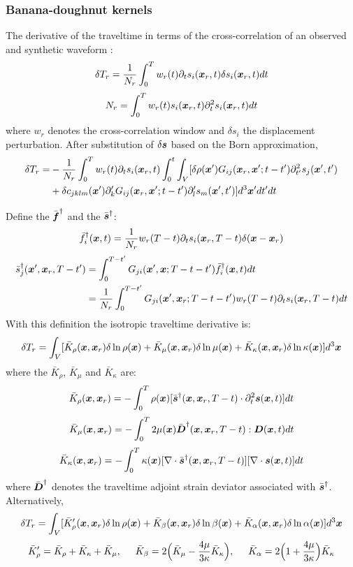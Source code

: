 \subsubsection{Banana-doughnut kernels}
The \Frechet derivative of the traveltime in terms of the cross-correlation
of an observed and synthetic waveform
:
\[ \delta T_r=\frac{1}{N_r}\int_0^Tw_r(t)\partial_ts_i(\boldsymbol{x}_r,t)\delta s_i(\boldsymbol{x}_r,t)dt \]
\[ N_r=\int_0^Tw_r(t)s_i(\boldsymbol{x}_r,t)\partial_t^2s_i(\boldsymbol{x}_r,t)dt \]
where $w_r$ denotes the cross-correlation window and $\delta s_i$ the displacement perturbation.
After substitution of $\delta\boldsymbol{s}$ based on the Born approximation,
\begin{align*}
  \delta T_r= & -\frac{1}{N_r}\int_0^Tw_r(t)\partial_ts_i(\boldsymbol{x}_r,t)\int_0^t\int_V[\delta\rho(\boldsymbol{x}')G_{ij}(\boldsymbol{x}_r,\boldsymbol{x}';t-t')\partial_{t'}^2s_j(\boldsymbol{x}',t') \\
    & +\delta c_{jklm}(\boldsymbol{x}')\partial_k' G_{ij}(\boldsymbol{x}_r,\boldsymbol{x}';t-t')\partial_l' s_m(\boldsymbol{x}',t')]d^3\boldsymbol{x}'dt'dt
\end{align*}

Define the  $\bar{\boldsymbol{f}}^\dagger$
and the  $\bar{\boldsymbol{s}}^\dagger$:
\[ \bar f_i^\dagger(\boldsymbol{x},t)=\frac{1}{N_r}w_r(T-t)\partial_ts_i(\boldsymbol{x}_r,T-t)\delta(\boldsymbol{x}-\boldsymbol{x}_r) \]
\begin{align*}
  \bar s_j^\dagger(\boldsymbol{x}',\boldsymbol{x}_r,T-t') & =\int_0^{T-t'}G_{ji}(\boldsymbol{x}',\boldsymbol{x};T-t-t')\bar f_i^\dagger(\boldsymbol{x},t)dt \\
    & =\frac{1}{N_r}\int_0^{T-t'}G_{ji}(\boldsymbol{x}',\boldsymbol{x}_r;T-t-t')w_r(T-t)\partial_ts_i(\boldsymbol{x}_r,T-t)dt
\end{align*}
With this definition the isotropic traveltime \Frechet derivative is:
\[ \delta T_r=\int_V[\bar K_\rho(\boldsymbol{x},\boldsymbol{x}_r)\delta\ln\rho(\boldsymbol{x})+\bar K_\mu(\boldsymbol{x},\boldsymbol{x}_r)\delta\ln\mu(\boldsymbol{x})+\bar K_\kappa(\boldsymbol{x},\boldsymbol{x}_r)\delta\ln\kappa(\boldsymbol{x})]d^3\boldsymbol{x} \]
where the 
$\bar K_\rho$, $\bar K_\mu$ and $\bar K_\kappa$ are:
\[ \bar K_\rho(\boldsymbol{x},\boldsymbol{x}_r)=-\int_0^T\rho(\boldsymbol{x})[\bar{\boldsymbol{s}}^\dagger(\boldsymbol{x},\boldsymbol{x}_r,T-t)\cdot\partial_t^2\boldsymbol{s}(\boldsymbol{x},t)]dt \]
\[ \bar K_\mu(\boldsymbol{x},\boldsymbol{x}_r)=-\int_0^T2\mu(\boldsymbol{x})\bar{\boldsymbol{D}}^\dagger(\boldsymbol{x},\boldsymbol{x}_r,T-t):\boldsymbol{D}(\boldsymbol{x},t)dt \]
\[ \bar K_\kappa(\boldsymbol{x},\boldsymbol{x}_r)=-\int_0^T\kappa(\boldsymbol{x})[\nabla\cdot\bar{\boldsymbol{s}}^\dagger(\boldsymbol{x},\boldsymbol{x}_r,T-t)][\nabla\cdot\boldsymbol{s}(\boldsymbol{x},t)]dt \]
where $\bar{\boldsymbol{D}}^\dagger$ denotes the traveltime adjoint strain deviator
associated with $\bar{\boldsymbol{s}}^\dagger$.
Alternatively,
\[ \delta T_r=\int_V[\bar K_\rho'(\boldsymbol{x},\boldsymbol{x}_r)\delta\ln\rho(\boldsymbol{x})+\bar K_\beta(\boldsymbol{x},\boldsymbol{x}_r)\delta\ln\beta(\boldsymbol{x})+\bar K_\alpha(\boldsymbol{x},\boldsymbol{x}_r)\delta\ln\alpha(\boldsymbol{x})]d^3\boldsymbol{x} \]
\[ \bar K_\rho'=\bar K_\rho+\bar K_\kappa+\bar K_\mu, \hspace{5mm} \bar K_\beta=2\Big(\bar K_\mu-\frac{4\mu}{3\kappa}\bar K_\kappa\Big), \hspace{5mm} \bar K_\alpha=2\Big(1+\frac{4\mu}{3\kappa}\Big)\bar K_\kappa \]

